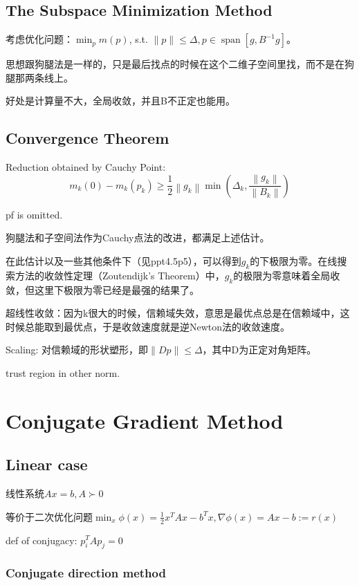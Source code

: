 \subsection{The Subspace Minimization Method}

考虑优化问题：$\min_{p} m(p)$, s.t. $\|p\| \leq \Delta, p \in \operatorname{span}\left[g, B^{-1} g\right]$。

思想跟狗腿法是一样的，只是最后找点的时候在这个二维子空间里找，而不是在狗腿那两条线上。

好处是计算量不大，全局收敛，并且B不正定也能用。

\subsection{Convergence Theorem}

Reduction obtained by Cauchy Point:
\[
  m_{k}(0)-m_{k}\left(p_{k}\right) \geq \frac{1}{2}\left\|g_{k}\right\| \min \left(\Delta_{k}, \frac{\left\|g_{k}\right\|}{\left\|B_{k}\right\|}\right)
\]

pf is omitted.

狗腿法和子空间法作为Cauchy点法的改进，都满足上述估计。

在此估计以及一些其他条件下（见ppt4.5p5），可以得到$g_k$的下极限为零。在线搜索方法的收敛性定理（Zoutendijk's Theorem）中，$g_k$的极限为零意味着全局收敛，但这里下极限为零已经是最强的结果了。

超线性收敛：因为k很大的时候，信赖域失效，意思是最优点总是在信赖域中，这时候总能取到最优点，于是收敛速度就是逆Newton法的收敛速度。

Scaling: 对信赖域的形状塑形，即$\|Dp\| \le \Delta$，其中D为正定对角矩阵。

trust region in other norm.

\section{Conjugate Gradient Method}

\subsection{Linear case}

线性系统$Ax = b, A \succ 0$

等价于二次优化问题$\min_{x} \phi(x)=\frac{1}{2} x^{T} A x-b^{T} x, \nabla \phi(x)=A x-b:=r(x)$

def of conjugacy: $p_i^T A p_j = 0$

\subsubsection{Conjugate direction method}

